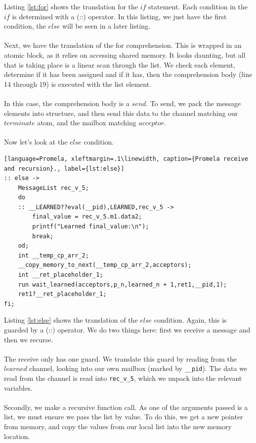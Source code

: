 Listing \ref{lst:for} shows the translation for the $if$ statement. Each condition in the $if$ is determined with a (::) operator. In this listing, we just have the first condition, the $else$ will be seen in a later listing. 
\\ \\
Next, we have the translation of the for comprehension. This is wrapped in an atomic block, as it relies on accessing shared memory. It looks daunting, but all that is taking place is a linear scan through the list. We check each element, determine if it has been assigned and if it has, then the comprehension body (line 14 through 19) is executed with the list element.
\\ \\
In this case, the comprehension body is a $send$. To send, we pack the message elements into structure, and then send this data to the channel matching our $terminate$ atom, and the mailbox matching $acceptor$.
\\ \\
Now let's look at the $else$ condition.
\begin{lstlisting}[language=Promela, xleftmargin=.1\linewidth, caption={Promela receive and recursion}., label={lst:else}]
:: else -> 
    MessageList rec_v_5;
    do
    :: __LEARNED??eval(__pid),LEARNED,rec_v_5 -> 
        final_value = rec_v_5.m1.data2;
        printf("Learned final_value:\n");
        break;
    od;
    int __temp_cp_arr_2;
    __copy_memory_to_next(__temp_cp_arr_2,acceptors);
    int __ret_placeholder_1;
    run wait_learned(acceptors,p_n,learned_n + 1,ret1,__pid,1);
    ret1?__ret_placeholder_1;
fi;
\end{lstlisting}
Listing \ref{lst:else} shows the translation of the $else$ condition. Again, this is guarded by a (::) operator. We do two things here: first we receive a message and then we recurse.
\\ \\
The receive only has one guard. We translate this guard by reading from the $learned$ channel, looking into our own mailbox (marked by \texttt{\_\_pid}). The data we read from the channel is read into \texttt{rec\_v\_5}, which we unpack into the relevant variables.
\\ \\
Secondly, we make a recursive function call. As one of the arguments passed is a list, we must ensure we pass the list by value. To do this, we get a new pointer from memory, and copy the values from our local list into the new memory location.
